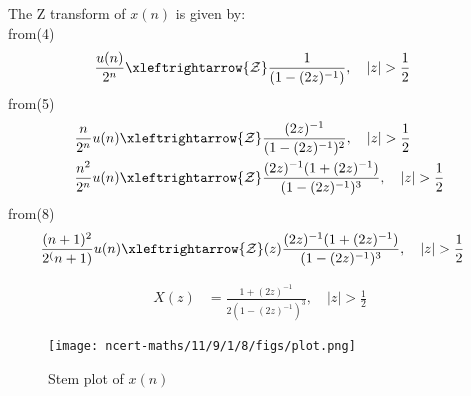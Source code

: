 \documentclass[journal,12pt,twocolumn]{IEEEtran}
\theoremstyle{remark}
\begin{document}
The Z transform of $x(n)$ is given by:\\
from(4)
\begin{align}
\frac{u(n)}{2^n} & \xleftrightarrow{\mathcal{Z}}  \frac{1}{(1-(2z)^{-1})}, \quad \lvert z \rvert>\frac{1}{2}
\end{align}
	from(5)
\begin{align}
\frac{n}{2^n} u(n) & \xleftrightarrow{\mathcal{Z}} \frac{(2z)^{-1}}{(1-(2z)^{-1})^2}, \quad \lvert z \rvert>\frac{1}{2}\\
\frac{n^2}{2^n} u(n) & \xleftrightarrow{\mathcal{Z}} \frac{(2z)^{-1}(1 + (2z)^{-1})}{(1 - (2z)^{-1})^3}, \quad \lvert z \rvert>\frac{1}{2}
\end{align}
	from(8)
\begin{align}
\frac{(n+1)^2}{2^(n+1)} u(n) & \xleftrightarrow{\mathcal{Z}} (z) \frac{(2z)^{-1}(1 + (2z)^{-1})}{(1 - (2z)^{-1})^3}, \quad \lvert z \rvert > \frac{1}{2}
\end{align}

\begin{align}
X(z) &= \frac{1 + (2z)^{-1}}{2(1 - (2z)^{-1})^3}, \quad \lvert z \rvert > \frac{1}{2}
\end{align}

\begin{figure}[h!]
    \centering
    \texttt{[image: ncert-maths/11/9/1/8/figs/plot.png]}
    \caption{Stem plot of $x(n)$}
    \label{fig:sr1}
\end{figure}

\end{document}
